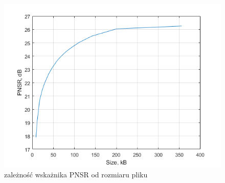 \documentclass{report}
\begin{document}
\renewcommand{\ww}{0.5}
\begin{figure}

    \includegraphics[]{../matlab/size_pnsr_jpg.png   }
    \centering

    \caption{zależność wskażnika PNSR od rozmiaru pliku} %
    \label{fig:fig1}
\end{figure}






\renewcommand{\ww}{0.16}
\end{document}
